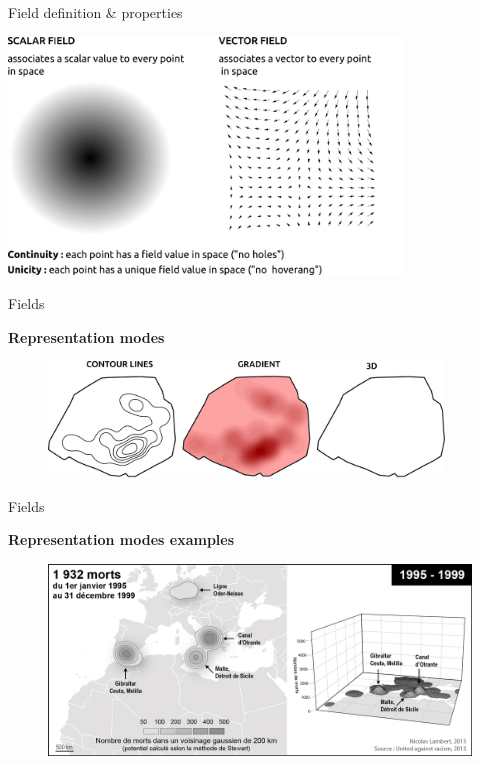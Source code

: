 \begin{frame}{Field definition \& properties}
\begin{center}
\includegraphics[width=10.5cm]{Champs_EN.pdf}
\end{center}
\end{frame}
\begin{frame}{Fields}

\textbf{Representation modes}

\begin{figure}
\includegraphics[width=10.5cm]{DeuxSorties_EN.pdf}
\end{figure}

\end{frame}



\begin{frame}{Fields}

\textbf{Representation modes examples}

\begin{figure}
\includegraphics[width=11.5cm]{Migrants1.png}
\end{figure}

\end{frame}

